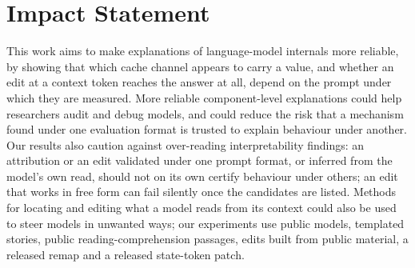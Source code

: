 \section*{Impact Statement}
This work aims to make explanations of language-model internals more reliable, by showing that which cache channel appears to carry a value, and whether an edit at a context token reaches the answer at all, depend on the prompt under which they are measured. More reliable component-level explanations could help researchers audit and debug models, and could reduce the risk that a mechanism found under one evaluation format is trusted to explain behaviour under another. Our results also caution against over-reading interpretability findings: an attribution or an edit validated under one prompt format, or inferred from the model's own read, should not on its own certify behaviour under others; an edit that works in free form can fail silently once the candidates are listed. Methods for locating and editing what a model reads from its context could also be used to steer models in unwanted ways; our experiments use public models, templated stories, public reading-comprehension passages, edits built from public material, a released remap and a released state-token patch.
